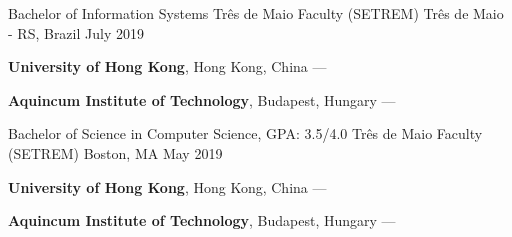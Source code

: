 
\begin{cventries}
  \cventry
  {Bachelor of Information Systems} %
  {Três de Maio Faculty (SETREM)} %
  {Três de Maio - RS, Brazil} %
  {July 2019} %
  {
    \begin{cvitems} %
      \item {\textbf{University of Hong Kong}, Hong Kong, China --- }
      \vspace{0.5mm}
      \item {\textbf{Aquincum Institute of Technology}, Budapest, Hungary --- }
    \end{cvitems}
  }

  \cventry
  {Bachelor of Science in Computer Science, GPA: 3.5/4.0} %
  {Três de Maio Faculty (SETREM)} %
  {Boston, MA} %
  {May 2019} %
  {
    \begin{cvitems} %
      \item {\textbf{University of Hong Kong}, Hong Kong, China --- }
      \vspace{0.5mm}
      \item {\textbf{Aquincum Institute of Technology}, Budapest, Hungary --- }
    \end{cvitems}
  }
\end{cventries}
